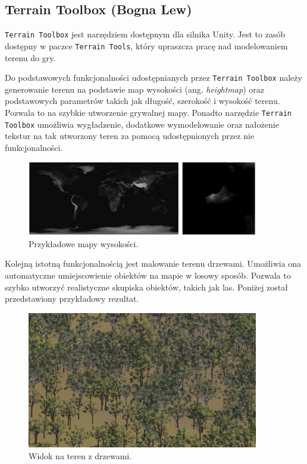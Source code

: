 \subsection{Terrain Toolbox (Bogna Lew)}\label{ss:tTool}
\texttt{Terrain Toolbox} jest narzędziem dostępnym dla silnika Unity. Jest to zasób dostępny w paczce \texttt{Terrain Tools}, który
upraszcza pracę nad modelowaniem terenu do gry.

Do podstawowych funkcjonalności udostępnianych przez \texttt{Terrain Toolbox} należy generowanie terenu na podstawie
map wysokości (ang. \textit{heightmap}) oraz podstawowych parametrów takich jak długość, szerokość i wysokość terenu.
Pozwala to na szybkie utworzenie grywalnej mapy. Ponadto narzędzie \texttt{Terrain Toolbox} umożliwia wygładzenie, dodatkowe
wymodelowanie oraz nałożenie tekstur na tak utworzony teren za pomocą udostępnionych przez nie funkcjonalności.

\begin{figure}[h!]
    \centering
    \includegraphics[width=0.9\textwidth]{images/modelowanie_terenu/przykladowe_heightmapy.jpg}
    \caption{Przykładowe mapy wysokości.}
\end{figure}

Kolejną istotną funkcjonalnością jest malowanie terenu drzewami. Umożliwia ona automatyczne umiejscowienie obiektów na
mapie w losowy sposób. Pozwala to szybko utworzyć realistyczne skupiska obiektów, takich jak las. Poniżej
został przedstawiony przykładowy rezultat.

\begin{figure}[h!]
    \centering
    \includegraphics[width=0.9\textwidth]{images/modelowanie_terenu/drzewa.jpg}
    \caption{Widok na teren z drzewami.}
\end{figure}
